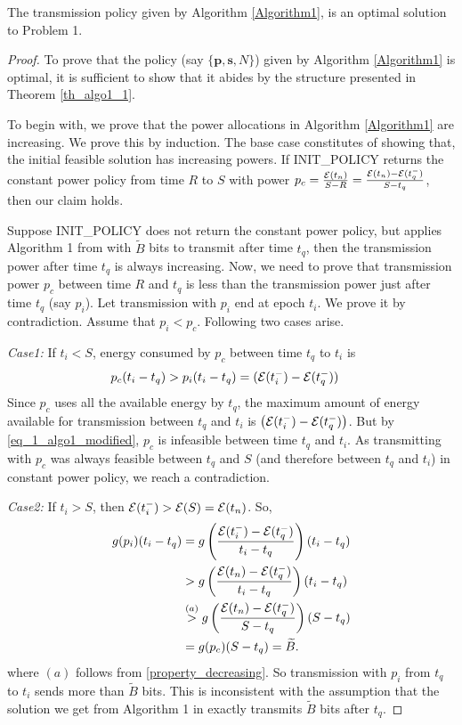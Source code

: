 \begin{theorem}
The transmission policy given by Algorithm \ref{Algorithm1}, is an optimal solution to Problem 1.
\label{th_algo1_2}
\end{theorem}


\begin{proof}
To prove that the policy (say $\{\textbf{p},\textbf{s},N\}$) given by Algorithm \ref{Algorithm1} is optimal, it is sufficient to show that it abides by the structure presented in Theorem \ref{th_algo1_1}.

To begin with, we prove that the power allocations in Algorithm \ref{Algorithm1} are increasing. We prove this by induction. The base case constitutes of showing that, the initial feasible solution has increasing powers. If INIT\_POLICY returns the constant power policy from time $R$ to $S$ with power $p_c=\frac{\mathcal{E}(t_n)}{S-R}=\frac{\mathcal{E}(t_n)-\mathcal{E}(t_q^-)}{S-t_q}$, then our claim holds. 

Suppose INIT\_POLICY does not return the constant power policy, but applies Algorithm 1 from \cite{Yang} with $\widetilde{B}$ bits to transmit after time $t_q$, then the transmission power after time $t_q$ is always increasing. Now, we need to prove that transmission power $p_c$ between time $R$ and $t_q$ is less than the transmission power just after time $t_q$ (say $p_i$). Let transmission with $p_i$ end at epoch $t_i$. We prove it by contradiction. Assume that $p_i<p_c$. Following two cases arise.

\textit{Case1:} If $t_i<S$, energy consumed by $p_c$ between time $t_q$ to $t_i$ is 
\begin{align}
&p_c(t_i-t_q)>p_i(t_i-t_q)=(\ETx(t_i^-)-\ETx(t_q^-))\label{eq_1_algo1_modified}
\end{align}
Since $p_c$ uses all the available energy by $t_q$, the maximum amount of energy available for transmission between $t_q$ and $t_i$ is $\left(\mathcal{E}(t_i^-)-\mathcal{E}(t_q^-)\right)$. But by \eqref{eq_1_algo1_modified}, $p_c$ is infeasible between time $t_q$ and $t_i$. As transmitting with $p_c$ was always feasible between $t_q$ and $S$ (and therefore between $t_q$ and $t_i$) in constant power policy, we reach a contradiction.        

\textit{Case2:} If $t_i>S$, then $\mathcal{E}(t_i^-)>\mathcal{E}(S)=\mathcal{E}(t_n)$. So, 
\begin{align}
g(p_i)(t_i-t_q)&=g\left(\frac{\ETx(t_i^-)-\ETx(t_q^-)}{t_i-t_q}\right)(t_i-t_q)
\\
&>g\left(\frac{\ETx(t_n)-\ETx(t_q^-)}{t_i-t_q}\right)(t_i-t_q)
\\
&\stackrel{(a)}{>}g\left(\frac{\ETx(t_n)-\ETx(t_q^-)}{S-t_q}\right)(S-t_q)\label{eq_2_algo1_modified}
\\
&=g(p_c)(S-t_q)=\widetilde{B}.
\end{align}
where %
$(a)$ follows from \eqref{property_decreasing}. So transmission with $p_i$ from $t_q$ to $t_i$ sends more than $\widetilde{B}$ bits. This is inconsistent with the assumption that the solution we get from Algorithm 1 in \cite{Yang} exactly transmits $\widetilde{B}$ bits after $t_q$. 


\end{proof}
